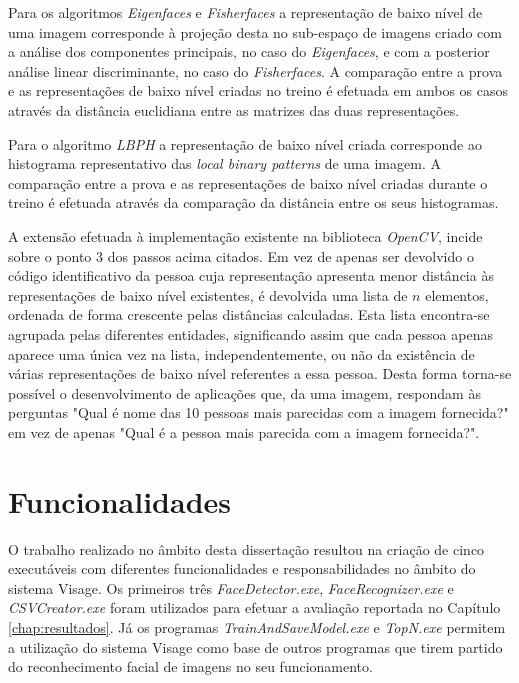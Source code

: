 Para os algoritmos \textit{Eigenfaces} e \textit{Fisherfaces} a representação de baixo nível de uma imagem corresponde à projeção desta no sub-espaço de imagens criado com a análise dos componentes principais, no caso do \textit{Eigenfaces}, e com a posterior análise linear discriminante, no caso do \textit{Fisherfaces}. A comparação entre a prova e as representações de baixo nível criadas no treino é efetuada em ambos os casos através da distância euclidiana entre as matrizes das duas representações.

Para o algoritmo \textit{LBPH} a representação de baixo nível criada corresponde ao histograma representativo das \textit{local binary patterns} de uma imagem. A comparação entre a prova e as representações de baixo nível criadas durante o treino é efetuada através da comparação da distância entre os seus histogramas.

A extensão efetuada à implementação existente na biblioteca \textit{OpenCV}, incide sobre o ponto 3 dos passos acima citados. Em vez de apenas ser devolvido o código identificativo da pessoa cuja representação apresenta menor distância às representações de baixo nível existentes, é devolvida uma lista de $n$ elementos, ordenada de forma crescente pelas distâncias calculadas. Esta lista encontra-se agrupada pelas diferentes entidades, significando assim que cada pessoa apenas aparece uma única vez na lista, independentemente, ou não da existência de várias representações de baixo nível referentes a essa pessoa. Desta forma torna-se possível o desenvolvimento de aplicações que, da uma imagem, respondam às perguntas "Qual é nome das 10 pessoas mais parecidas com a imagem fornecida?" em vez de apenas "Qual é a pessoa mais parecida com a imagem fornecida?".

\section{Funcionalidades}
O trabalho realizado no âmbito desta dissertação resultou na criação de cinco executáveis com diferentes funcionalidades e responsabilidades no âmbito do sistema Visage. Os primeiros três \textit{FaceDetector.exe}, \textit{FaceRecognizer.exe} e \textit{CSVCreator.exe} foram utilizados para efetuar a avaliação reportada no Capítulo \ref{chap:resultados}. Já os programas \textit{TrainAndSaveModel.exe} e \textit{TopN.exe} permitem a utilização do sistema Visage como base de outros programas que tirem partido do reconhecimento facial de imagens no seu funcionamento.


